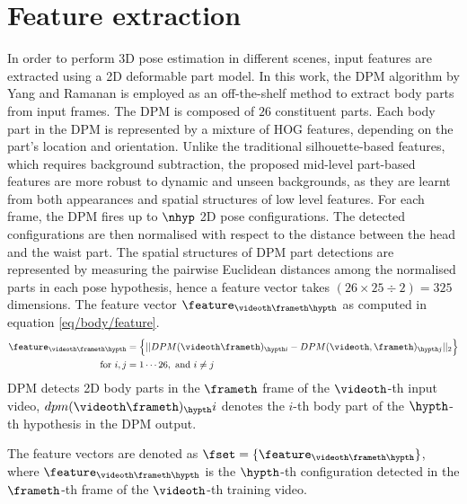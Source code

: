 \section{Feature extraction}

In order to perform 3D pose estimation in different scenes, input features are extracted using a 2D deformable part model.  
In this work, the DPM algorithm by Yang and Ramanan \cite{Yang2011} is employed as an off-the-shelf method to extract body parts from input frames. 
The DPM is composed of $26$ constituent parts. Each body part in the DPM is represented by a mixture of HOG features, depending on the part's location and orientation. 
Unlike the traditional silhouette-based features, which requires background subtraction, the proposed mid-level part-based features are more robust to dynamic and unseen backgrounds, as they are learnt from both appearances and spatial structures of low level features. 
For each frame, the DPM fires up to $\nhyp$ 2D pose configurations.  
The detected configurations are then normalised with respect to the distance between the head and the waist part. 
The spatial structures of DPM part detections are represented by measuring the pairwise Euclidean distances among the normalised parts in each pose hypothesis, hence a feature vector takes $(26 \times 25 \div 2) = 325$ dimensions.
The feature vector $\feature_{\videoth\frameth\hypth}$ as computed in equation \ref{eq/body/feature}.
\begin{equation}
	\label{eq/body/feature} 
	\begin{aligned}
		\feature_{\videoth\frameth\hypth} & = \Big\{ || DPM(\videoth\frameth)_{\hypth i} - DPM(\videoth, \frameth)_{\hypth j} ||_{2} \Big\} \\ 
		\mbox{ for } i, j & = 1\cdots26, \mbox{ and } i \not= j
	\end{aligned}
\end{equation}
DPM detects 2D body parts in the $\frameth$ frame of the $\videoth$-th input video, $dpm(\videoth\frameth)_\hypth i$ denotes the $i$-th body part of the $\hypth$-th hypothesis in the DPM output.  

The feature vectors are denoted as $\fset = \{\feature_{\videoth\frameth\hypth}\}$, where $\feature_{\videoth\frameth\hypth}$ is the $\hypth$-th configuration detected in the $\frameth$-th frame of the $\videoth$-th training video. 

